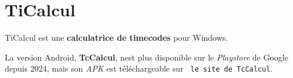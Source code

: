 \chapter{Ti\+Calcul}
\label{md__r_e_a_d_m_e}
\label{md__r_e_a_d_m_e_autotoc_md0}%
 Ti\+Calcul est une {\bfseries{calculatrice de timecodes}} pour Windows. ~\newline




La version Android, {\bfseries{Tc\+Calcul}}, n\textquotesingle{}est plus disponible sur le {\itshape Playstore} de Google depuis 2024, mais son {\itshape APK} est téléchargeable sur {\texttt{ le site de Tc\+Calcul}}. 